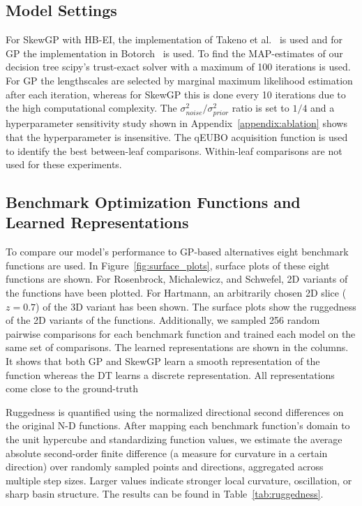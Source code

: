 \documentclass{article}
\begin{document}
\subsection{Model Settings}\label{appendix:model_settings}
For SkewGP with HB-EI, the implementation of Takeno et al.~\cite{takeno2023towards} is used and for GP the implementation in Botorch~\cite{balandat2020botorch} is used. To find the MAP-estimates of our decision tree scipy's trust-exact solver with a maximum of 100 iterations is used. For GP the lengthscales are selected by marginal maximum likelihood estimation after each iteration, whereas for SkewGP this is done every 10 iterations due to the high computational complexity. 
The $\sigma^2_{noise}/\sigma^2_{prior}$ ratio is set to $1/4$ and a hyperparameter sensitivity study shown in Appendix~\ref{appendix:ablation} shows that the hyperparameter is insensitive.
The qEUBO acquisition function is used to identify the best between-leaf comparisons. Within-leaf comparisons are not used for these experiments. 

\subsection{Benchmark Optimization Functions and Learned Representations}\label{appendix:opt_plots}
To compare our model's performance to GP-based alternatives eight benchmark functions are used. In Figure~\ref{fig:surface_plots}, surface plots of these eight functions are shown. For Rosenbrock, Michalewicz, and Schwefel, 2D variants of the functions have been plotted. For Hartmann, an arbitrarily chosen 2D slice ($z=0.7$) of the 3D variant has been shown. The surface plots show the ruggedness of the 2D variants of the functions. Additionally, we sampled 256 random pairwise comparisons for each benchmark function and trained each model on the same set of comparisons. The learned representations are shown in the columns. It shows that both GP and SkewGP learn a smooth representation of the function whereas the DT learns a discrete representation. All representations come close to the ground-truth

Ruggedness is quantified using the normalized directional second differences on the original N-D functions. After mapping each benchmark function's domain to the unit hypercube and standardizing function values, we estimate the average absolute second-order finite difference (a measure for curvature in a certain direction) over randomly sampled points and directions, aggregated across multiple step sizes. Larger values indicate stronger local curvature, oscillation, or sharp basin structure. The results can be found in Table~\ref{tab:ruggedness}. 
\end{document}

